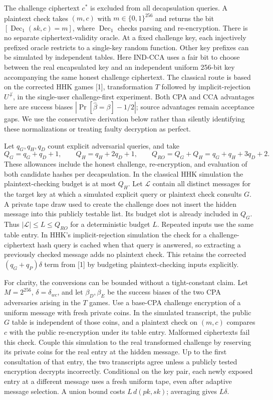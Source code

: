 \documentclass[
  10pt,
  a4paper,
]{article}
\begin{document}
The challenge ciphertext \(c^*\) is excluded from all decapsulation
queries. A plaintext check takes \((m,c)\) with \(m\in\{0,1\}^{256}\)
and returns the bit \([\operatorname{Dec}_1(sk,c)=m]\), where
\(\operatorname{Dec}_1\) checks parsing and re-encryption. There is no
separate ciphertext-validity oracle. At a fixed challenge key, each
injectively prefixed oracle restricts to a single-key random function.
Other key prefixes can be simulated by independent tables. Here IND-CCA
uses a fair bit to choose between the real encapsulated key and an
independent uniform 256-bit key accompanying the same honest challenge
ciphertext. The classical route is based on the corrected HHK games
{[}1{]}, transformation \(T\) followed by implicit-rejection
\(U^{\not\perp}\), in the single-user challenge-first experiment. Both
CPA and CCA advantages here are success biases
\(|\Pr[\widehat\beta=\beta]-1/2|\); source advantages remain acceptance
gaps. We use the conservative derivation below rather than silently
identifying these normalizations or treating faulty decryption as
perfect.

Let \(q_G,q_H,q_D\) count explicit adversarial queries, and take \[
Q_G=q_G+q_D+1,\qquad Q_H=q_H+2q_D+1,\qquad
Q_{RO}=Q_G+Q_H=q_G+q_H+3q_D+2.
\] These allowances include the honest challenge, re-encryption, and
evaluation of both candidate hashes per decapsulation. In the classical
HHK simulation the plaintext-checking budget is at most \(Q_H\). Let
\(\mathcal L\) contain all distinct messages for the target key at which
a simulated explicit query or plaintext check consults \(G\). A private
tape draw used to create the challenge does not insert the hidden
message into this publicly testable list. Its budget slot is already
included in \(Q_G\). Thus \(|\mathcal L|\le L\le Q_{RO}\) for a
deterministic budget \(L\). Repeated inputs use the same table entry. In
HHK's implicit-rejection simulation the check for a challenge-ciphertext
hash query is cached when that query is answered, so extracting a
previously checked message adds no plaintext check. This retains the
corrected \((q_G+q_P)\delta\) term from {[}1{]} by budgeting
plaintext-checking inputs explicitly.

For clarity, the conversions can be bounded without a tight-constant
claim. Let \(M=2^{256}\), \(\delta=\delta_{wc}\), and let
\(\beta_D,\beta_E\) be the success biases of the two CPA adversaries
arising in the \(T\) games. Use a base-CPA challenge encryption of a
uniform message with fresh private coins. In the simulated transcript,
the public \(G\) table is independent of those coins, and a plaintext
check on \((m,c)\) compares \(c\) with the public re-encryption under
its table entry. Malformed ciphertexts fail this check. Couple this
simulation to the real transformed challenge by reserving its private
coins for the real entry at the hidden message. Up to the first
consultation of that entry, the two transcripts agree unless a publicly
tested encryption decrypts incorrectly. Conditional on the key pair,
each newly exposed entry at a different message uses a fresh uniform
tape, even after adaptive message selection. A union bound costs
\(L\,d(pk,sk)\); averaging gives \(L\delta\).
\end{document}
